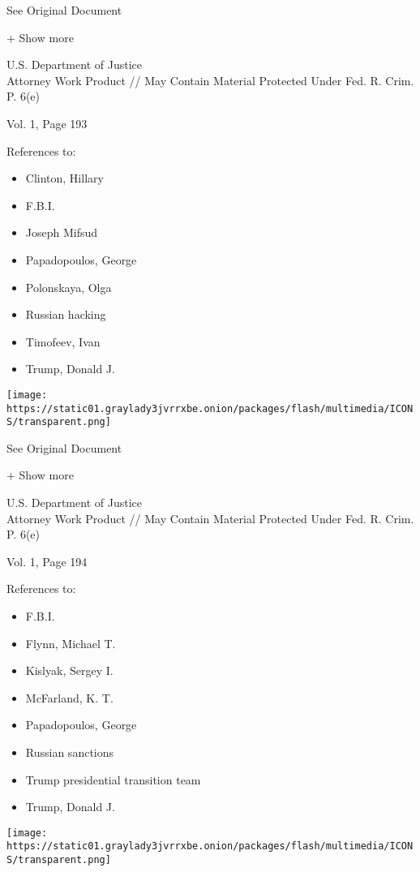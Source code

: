 See Original Document

+ Show more

U.S. Department of Justice\\
Attorney Work Product // May Contain Material Protected Under Fed. R.
Crim. P. 6(e)

Vol. 1, Page 193

References to:

\begin{itemize}
\tightlist
\item
  Clinton, Hillary
\item
  F.B.I.
\item
  Joseph Mifsud
\item
  Papadopoulos, George
\item
  Polonskaya, Olga
\item
  Russian hacking
\item
  Timofeev, Ivan
\item
  Trump, Donald J.
\end{itemize}

\protect\hyperlink{}{}

\texttt{[image: https://static01.graylady3jvrrxbe.onion/packages/flash/multimedia/ICONS/transparent.png]}

See Original Document

+ Show more

U.S. Department of Justice\\
Attorney Work Product // May Contain Material Protected Under Fed. R.
Crim. P. 6(e)

Vol. 1, Page 194

References to:

\begin{itemize}
\tightlist
\item
  F.B.I.
\item
  Flynn, Michael T.
\item
  Kislyak, Sergey I.
\item
  McFarland, K. T.
\item
  Papadopoulos, George
\item
  Russian sanctions
\item
  Trump presidential transition team
\item
  Trump, Donald J.
\end{itemize}

\protect\hyperlink{}{}

\texttt{[image: https://static01.graylady3jvrrxbe.onion/packages/flash/multimedia/ICONS/transparent.png]}


